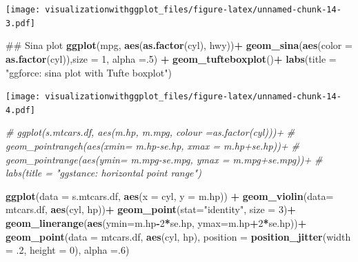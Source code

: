 \documentclass[]{krantz}
\makeatletter
\newenvironment{Shaded}{\begin{snugshade}}{\end{snugshade}}
\newcommand{\KeywordTok}[1]{\textcolor[rgb]{0.13,0.29,0.53}{\textbf{#1}}}
\newcommand{\DataTypeTok}[1]{\textcolor[rgb]{0.13,0.29,0.53}{#1}}
\newcommand{\DecValTok}[1]{\textcolor[rgb]{0.00,0.00,0.81}{#1}}
\newcommand{\StringTok}[1]{\textcolor[rgb]{0.31,0.60,0.02}{#1}}
\newcommand{\CommentTok}[1]{\textcolor[rgb]{0.56,0.35,0.01}{\textit{#1}}}
\newcommand{\OperatorTok}[1]{\textcolor[rgb]{0.81,0.36,0.00}{\textbf{#1}}}
\newcommand{\NormalTok}[1]{#1}
\newenvironment{kframe}{%
\medskip{}
\setlength{\fboxsep}{.8em}
 \def\at@end@of@kframe{}%
 \ifinner\ifhmode%
  \def\at@end@of@kframe{\end{minipage}}%
  \begin{minipage}{\columnwidth}%
 \fi\fi%
 \def\FrameCommand##1{\hskip\@totalleftmargin \hskip-\fboxsep
 \colorbox{shadecolor}{##1}\hskip-\fboxsep
     \hskip-\linewidth \hskip-\@totalleftmargin \hskip\columnwidth}%
 \MakeFramed {\advance\hsize-\width
   \@totalleftmargin\z@ \linewidth\hsize
   \@setminipage}}%
 {\par\unskip\endMakeFramed%
 \at@end@of@kframe}
\renewenvironment{Shaded}{\begin{kframe}}{\end{kframe}}
\theoremstyle{definition}
\theoremstyle{definition}
\theoremstyle{definition}
\theoremstyle{remark}
\makeatother
\begin{document}
\texttt{[image: visualizationwithggplot\_files/figure-latex/unnamed-chunk-14-3.pdf]}

\begin{Shaded}
\begin{Highlighting}[]
\NormalTok{## Sina plot}
\KeywordTok{ggplot}\NormalTok{(mpg, }\KeywordTok{aes}\NormalTok{(}\KeywordTok{as.factor}\NormalTok{(cyl), hwy))}\OperatorTok{+}
\StringTok{ }\KeywordTok{geom_sina}\NormalTok{(}\KeywordTok{aes}\NormalTok{(}\DataTypeTok{color =} \KeywordTok{as.factor}\NormalTok{(cyl)),}\DataTypeTok{size =} \DecValTok{1}\NormalTok{, }\DataTypeTok{alpha =}\NormalTok{.}\DecValTok{5}\NormalTok{) }\OperatorTok{+}
\StringTok{ }\KeywordTok{geom_tufteboxplot}\NormalTok{()}\OperatorTok{+}
\StringTok{  }\KeywordTok{labs}\NormalTok{(}\DataTypeTok{title =} \StringTok{"ggforce: sina plot with Tufte boxplot"}\NormalTok{)}
\end{Highlighting}
\end{Shaded}

\texttt{[image: visualizationwithggplot\_files/figure-latex/unnamed-chunk-14-4.pdf]}

\begin{Shaded}
\begin{Highlighting}[]
\CommentTok{# ggplot(s.mtcars.df, aes(m.hp, m.mpg, colour =as.factor(cyl)))+}
\CommentTok{# geom_pointrangeh(aes(xmin= m.hp-se.hp, xmax = m.hp+se.hp))+}
\CommentTok{#   geom_pointrange(aes(ymin= m.mpg-se.mpg, ymax = m.mpg+se.mpg))+}
\CommentTok{#   labs(title = "ggstance: horizontal point range")}


\KeywordTok{ggplot}\NormalTok{(}\DataTypeTok{data =}\NormalTok{ s.mtcars.df, }\KeywordTok{aes}\NormalTok{(}\DataTypeTok{x =}\NormalTok{ cyl, }\DataTypeTok{y =}\NormalTok{ m.hp)) }\OperatorTok{+}
\StringTok{  }\KeywordTok{geom_violin}\NormalTok{(}\DataTypeTok{data=}\NormalTok{ mtcars.df, }\KeywordTok{aes}\NormalTok{(cyl, hp))}\OperatorTok{+}
\StringTok{  }\KeywordTok{geom_point}\NormalTok{(}\DataTypeTok{stat=}\StringTok{"identity"}\NormalTok{, }\DataTypeTok{size =} \DecValTok{3}\NormalTok{)}\OperatorTok{+}
\StringTok{  }\KeywordTok{geom_linerange}\NormalTok{(}\KeywordTok{aes}\NormalTok{(}\DataTypeTok{ymin=}\NormalTok{m.hp}\OperatorTok{-}\DecValTok{2}\OperatorTok{*}\NormalTok{se.hp, }\DataTypeTok{ymax=}\NormalTok{m.hp}\OperatorTok{+}\DecValTok{2}\OperatorTok{*}\NormalTok{se.hp))}\OperatorTok{+}
\StringTok{  }\KeywordTok{geom_point}\NormalTok{(}\DataTypeTok{data =}\NormalTok{ mtcars.df, }\KeywordTok{aes}\NormalTok{(cyl, hp), }
             \DataTypeTok{position =} \KeywordTok{position_jitter}\NormalTok{(}\DataTypeTok{width =}\NormalTok{ .}\DecValTok{2}\NormalTok{, }\DataTypeTok{height =} \DecValTok{0}\NormalTok{), }\DataTypeTok{alpha =}\NormalTok{.}\DecValTok{6}\NormalTok{)}
\end{Highlighting}
\end{Shaded}
\end{document}

